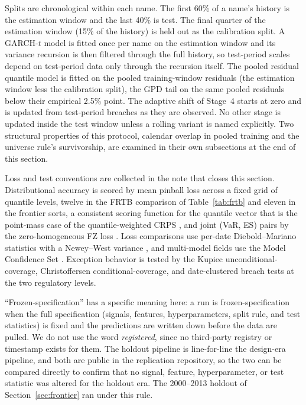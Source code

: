 \documentclass[11pt]{article}
\theoremstyle{remark}
\begin{document}
Splits are chronological within each name. The first 60\% of a name's
history is the estimation window and the last 40\% is test. The final
quarter of the estimation window (15\% of the history) is held out as
the calibration split. A GARCH-$t$ model is fitted once per name on
the estimation window and its variance recursion is then filtered
through the full history, so test-period scales depend on test-period
data only through the recursion itself. The pooled residual quantile
model is fitted on the pooled training-window residuals (the estimation window less the calibration split), the GPD tail on
the same pooled residuals below their empirical 2.5\% point. The adaptive shift of Stage~4 starts at zero and is updated from test-period breaches as they are observed. No other stage is updated
inside the test window unless a rolling variant is named explicitly.
Two structural properties of this protocol, calendar overlap in
pooled training and the universe rule's survivorship, are examined in
their own subsections at the end of this section.

Loss and test conventions are collected in the note that closes this section. Distributional accuracy is scored by mean pinball loss across a fixed grid of quantile levels, twelve in the FRTB comparison of Table~\ref{tab:frtb} and eleven in the frontier sorts, a consistent scoring function for the quantile vector that is the point-mass case of the quantile-weighted CRPS \citep{gneitingranjan2011}, and joint (VaR, ES) pairs by the zero-homogeneous FZ loss \citep{fissler2016,patton2019}. Loss comparisons use per-date Diebold--Mariano statistics \citep{dieboldmariano1995} with a Newey--West variance \citep{neweywest1987}, and multi-model fields use the Model Confidence Set \citep{hansen2011mcs}. Exception behavior is tested by the Kupiec unconditional-coverage, Christoffersen conditional-coverage, and date-clustered breach tests at the two regulatory levels.

``Frozen-specification'' has a specific meaning here: a run is
frozen-specification when the full specification (signals, features,
hyperparameters, split rule, and test statistics) is fixed and the
predictions are written down before the data are pulled. We do not use
the word \emph{registered}, since no third-party registry or timestamp
exists for them. The holdout pipeline is line-for-line the
design-era pipeline, and both are public in the replication
repository, so the two can be compared directly to confirm that no signal,
feature, hyperparameter, or test statistic was altered for the holdout
era. The
2000--2013 holdout of Section~\ref{sec:frontier} ran under this rule. 
\end{document}
